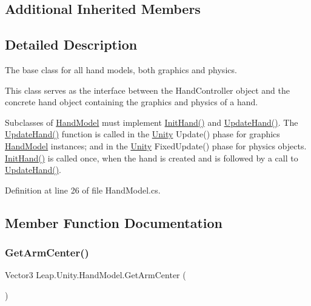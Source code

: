 \subsection*{Additional Inherited Members}


\subsection{Detailed Description}
The base class for all hand models, both graphics and physics.

This class serves as the interface between the Hand\+Controller object and the concrete hand object containing the graphics and physics of a hand.

Subclasses of \mbox{\hyperlink{class_leap_1_1_unity_1_1_hand_model}{Hand\+Model}} must implement \mbox{\hyperlink{class_leap_1_1_unity_1_1_hand_model_a67f1a6887e0803c96095a376fc1e6031}{Init\+Hand()}} and \mbox{\hyperlink{class_leap_1_1_unity_1_1_hand_model_acbb96fd18f28d01a74c1e0ac709b1977}{Update\+Hand()}}. The \mbox{\hyperlink{class_leap_1_1_unity_1_1_hand_model_acbb96fd18f28d01a74c1e0ac709b1977}{Update\+Hand()}} function is called in the \mbox{\hyperlink{namespace_leap_1_1_unity}{Unity}} Update() phase for graphics \mbox{\hyperlink{class_leap_1_1_unity_1_1_hand_model}{Hand\+Model}} instances; and in the \mbox{\hyperlink{namespace_leap_1_1_unity}{Unity}} Fixed\+Update() phase for physics objects. \mbox{\hyperlink{class_leap_1_1_unity_1_1_hand_model_a67f1a6887e0803c96095a376fc1e6031}{Init\+Hand()}} is called once, when the hand is created and is followed by a call to \mbox{\hyperlink{class_leap_1_1_unity_1_1_hand_model_acbb96fd18f28d01a74c1e0ac709b1977}{Update\+Hand()}}. 

Definition at line 26 of file Hand\+Model.\+cs.



\subsection{Member Function Documentation}
\mbox{\label{class_leap_1_1_unity_1_1_hand_model_a2b99e4722e90a53601927c31c4ef2954}} 
\subsubsection{\texorpdfstring{GetArmCenter()}{GetArmCenter()}}
{\footnotesize\ttfamily Vector3 Leap.\+Unity.\+Hand\+Model.\+Get\+Arm\+Center (\begin{DoxyParamCaption}{ }\end{DoxyParamCaption})}

